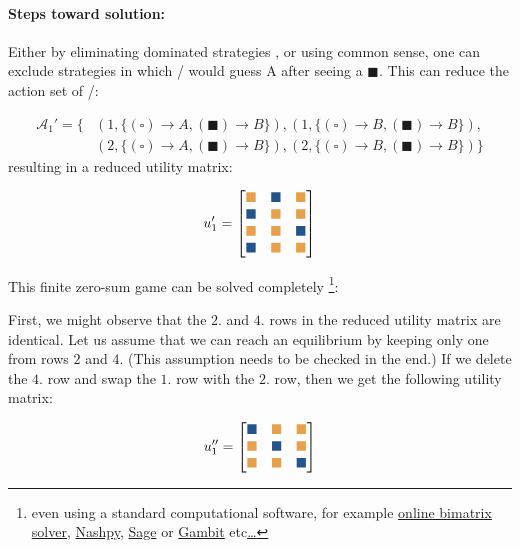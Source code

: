 \documentclass{article}
\newcommand{\wbox}{\textcolor{w}{\blacksquare}}
\newcommand{\lbox}{\textcolor{l}{\blacksquare}}
\newcommand{\wb}{\square}
\newcommand{\bb}{\blacksquare}
\theoremstyle{definition}
\begin{document}
\paragraph{Steps toward solution:}
Either by eliminating dominated strategies \cite{book:EssentialGameTheory, book:GameTheory}, or using common sense, one can exclude strategies in which \PI/ would guess A after seeing a $\bb$. This can reduce the action set of \PI/:

\begin{equation}
\begin{split}
\mathcal{A}_1' = \{ 
& (1,\{(\wb) \to A, (\bb) \to B\}), (1,\{(\wb) \to B, (\bb) \to B\}), \\
& (2,\{(\wb) \to A, (\bb) \to B\}), (2,\{(\wb) \to B, (\bb) \to B\})
\}
\end{split}
\end{equation}
resulting in a reduced utility matrix:

\setcounter{MaxMatrixCols}{12}
\begin{equation}
u_1'=
\begin{bmatrix}
\wbox & \lbox & \wbox \\
\lbox & \wbox & \wbox \\
\wbox & \wbox & \lbox \\
\lbox & \wbox & \wbox
\end{bmatrix}
\end{equation}

This finite zero-sum game can be solved completely \footnote{even using a standard computational software, for example \href{https://cgi.csc.liv.ac.uk/~rahul/bimatrix_solver/}{online bimatrix solver}, \href{https://nashpy.readthedocs.io/en/stable/}{Nashpy}, \href{https://doc.sagemath.org/html/en/reference/game_theory/index.html}{Sage} or \href{https://gambitproject.readthedocs.io/en/latest/intro.html}{Gambit} etc\href{https://www.wolfram.com/broadcast/video.php?v=3526}{\dots}}:

First, we might observe that the $2.$ and $4.$ rows in the reduced utility matrix are identical. Let us assume that we can reach an equilibrium by keeping only one from rows $2$ and $4$. (This assumption needs to be checked in the end.)
If we delete the $4.$ row and swap the $1.$ row with the $2.$ row, then we get the following utility matrix:

\begin{equation}
u_1''=
\begin{bmatrix}
\lbox & \wbox & \wbox \\
\wbox & \lbox & \wbox \\
\wbox & \wbox & \lbox
\end{bmatrix}
\end{equation}
\end{document}
